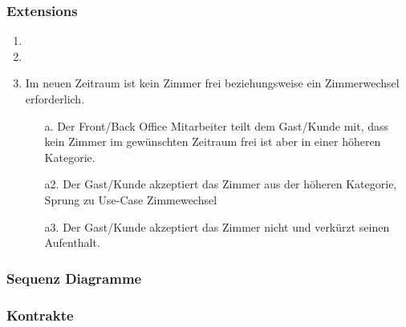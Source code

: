 \documentclass[./detailed_overview_usecases.tex]{subfiles}
\begin{document}
    \subsubsection*{Extensions}
    \begin{enumerate}
        \item 
		\item 
		\item Im neuen Zeitraum ist kein Zimmer frei beziehungsweise ein Zimmerwechsel erforderlich.
        \begin{itemize}
                       \item[a.] Der Front/Back Office Mitarbeiter teilt dem Gast/Kunde mit, dass kein Zimmer im gewünschten Zeitraum frei ist aber in einer höheren Kategorie.
					   \item[a2.] Der Gast/Kunde akzeptiert das Zimmer aus der höheren Kategorie, Sprung zu Use-Case Zimmewechsel
					   \item[a3.] Der Gast/Kunde akzeptiert das Zimmer nicht und verkürzt seinen Aufenthalt.
                       
        \end{itemize}
    \end{enumerate}

    \subsubsection{Sequenz Diagramme}
    \subsubsection{Kontrakte}
\end{document}
